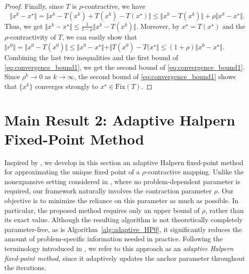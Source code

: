 \documentclass{article}
\theoremstyle{plain}
\theoremstyle{definition}
\newcommand{\sets}[1]{\{#1\}}
\newcommand{\norms}[1]{\Vert#1\Vert}
\newcommand{\0}{\boldsymbol{0}}
\begin{document}
\begin{proof}
Finally, since $T$ is $\rho$-contractive, we have  
 \begin{equation*}
     \norms{ x^k - x^{\star} }  = \norms{ x^k - T(x^k) + T(x^k) - T(x^{\star}) } \leq \norms{ x^k - T(x^k) } + \rho \norms{ x^k - x^{\star} }.
 \end{equation*}
 Thus, we get $\norms{ x^k - x^{\star} }  \leq \frac{1}{1-\rho} \norms{ x^k - T(x^k)}$. 
 Moreover, by $x^{\star} = T(x^{\star})$ and  the $\rho$-contractivity of $T$, we can easily show that $\norms{r^0} = \norms{x^0 - T(x^0)} \leq \norms{x^0 - x^{\star}} + \norms{T(x^0) - T(x^{\star}} \leq (1+\rho)\norms{x^0 - x^{\star}}$.
Combining the last two inequalities and the first bound of  \eqref{eq:convergence_bound1}, we get the second bound of  \eqref{eq:convergence_bound1}.
Since $\rho^k \to 0$ as $k \to \infty$, the second bound of  \eqref{eq:convergence_bound1} shows that $\sets{x^k}$ converges strongly to $x^{\star} \in \mathrm{Fix}(T)$.
\end{proof}

\section{Main Result 2: Adaptive Halpern Fixed-Point Method}\label{sec:adaptive_Halpern_method}
Inspired by \cite{he2024convergence}, we develop in this section an adaptive Halpern fixed-point method for approximating the unique fixed point of a $\rho$-contractive mapping. 
Unlike the nonexpansive setting considered in \cite{he2024convergence}, where no problem-dependent parameter is required, our framework naturally involves the contraction parameter $\rho$. 
Our objective is to minimize the reliance on this parameter as much as possible. 
In particular, the proposed method requires only an upper bound of $\rho$, rather than its exact value. 
Although the resulting algorithm is not theoretically completely parameter-free, as is Algorithm~\ref{alg:adaptive_HP0}, it significantly reduces the amount of problem-specific information needed in practice. 
Following the terminology introduced in \cite{he2024convergence}, we refer to this approach as an \emph{adaptive Halpern fixed-point method}, since it adaptively updates the anchor parameter throughout the iterations.

\end{document}
